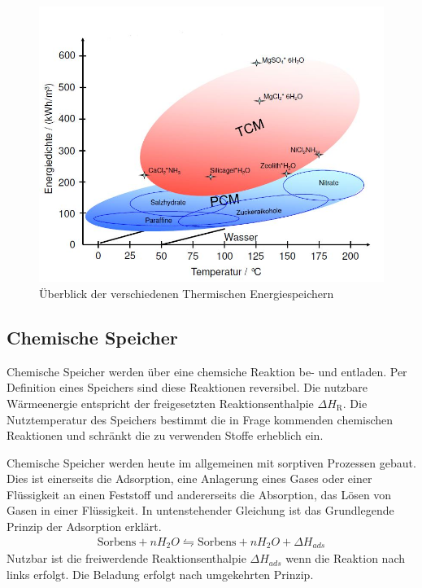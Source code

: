 \documentclass[11pt,a4paper]{scrartcl}
\begin{document}
\begin{figure}[h]
\begin{center}
\includegraphics[scale=0.5]{images/temperaturenergiedichte.jpg}
\caption{Überblick der verschiedenen Thermischen Energiespeichern \cite{zaebayern}}
\label{fig:temperaturenergiedichte}
\end{center}
\end{figure}

\subsection{Chemische Speicher}
Chemische Speicher werden über eine chemsiche Reaktion be- und entladen. Per
Definition eines Speichers sind diese Reaktionen reversibel. Die nutzbare
Wärmeenergie entspricht der freigesetzten Reaktionsenthalpie $\Delta
H_{\mathrm{R}}$. Die Nutztemperatur des Speichers bestimmt die in Frage
kommenden chemischen Reaktionen und schränkt die zu verwenden Stoffe erheblich
ein.

Chemische Speicher werden heute im allgemeinen mit sorptiven Prozessen gebaut.
Dies ist einerseits die Adsorption, eine Anlagerung eines Gases oder einer
Flüssigkeit an einen Feststoff und andererseits die Absorption, das Lösen von
Gasen in einer Flüssigkeit. In untenstehender Gleichung ist das Grundlegende
Prinzip der Adsorption erklärt.
\begin{align}
\text{Sorbens}+nH_2O\leftrightharpoons \text{Sorbens}+nH_2O+\Delta H_{ads}
\end{align}
Nutzbar ist die freiwerdende Reaktionsenthalpie $\Delta H_{ads}$ wenn die
Reaktion nach links erfolgt. Die Beladung erfolgt nach umgekehrten Prinzip.  
\cite{Wesselak}
\end{document}
